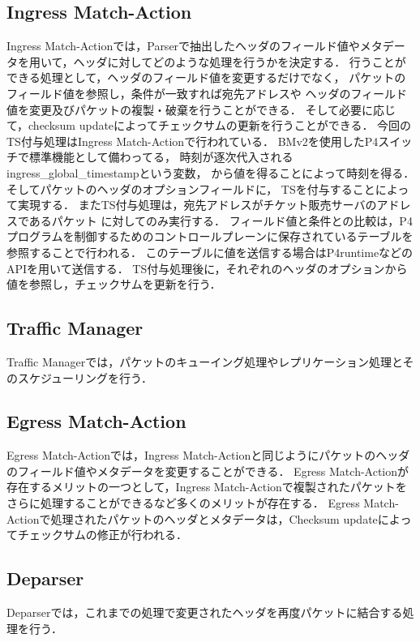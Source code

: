 \documentclass[a4j,11pt]{jreport}
\begin{document}
\subsection{Ingress Match-Action}
Ingress Match-Actionでは，Parserで抽出したヘッダのフィールド値やメタデータを用いて，ヘッダに対してどのような処理を行うかを決定する．
行うことができる処理として，ヘッダのフィールド値を変更するだけでなく，
パケットのフィールド値を参照し，条件が一致すれば宛先アドレスや
ヘッダのフィールド値を変更及びパケットの複製・破棄を行うことができる．
そして必要に応じて，checksum updateによってチェックサムの更新を行うことができる．
今回のTS付与処理はIngress Match-Actionで行われている．
BMv2を使用したP4スイッチで標準機能として備わってる，
時刻が逐次代入されるingress\_global\_timestampという変数，
から値を得ることによって時刻を得る．そしてパケットのヘッダのオプションフィールドに，
TSを付与することによって実現する．
またTS付与処理は，宛先アドレスがチケット販売サーバのアドレスであるパケット
に対してのみ実行する．
フィールド値と条件との比較は，P4プログラムを制御するためのコントロールプレーンに保存されているテーブルを参照することで行われる．
このテーブルに値を送信する場合はP4runtimeなどのAPIを用いて送信する．
TS付与処理後に，それぞれのヘッダのオプションから値を参照し，チェックサムを更新を行う．



\subsection{Traffic Manager}
Traffic Managerでは，パケットのキューイング処理やレプリケーション処理とそのスケジューリングを行う．

\subsection{Egress Match-Action}
Egress Match-Actionでは，Ingress Match-Actionと同じようにパケットのヘッダのフィールド値やメタデータを変更することができる．
Egress Match-Actionが存在するメリットの一つとして，Ingress Match-Actionで複製されたパケットをさらに処理することができるなど多くのメリットが存在する．
Egress Match-Actionで処理されたパケットのヘッダとメタデータは，Checksum updateによってチェックサムの修正が行われる．

\subsection{Deparser}
Deparserでは，これまでの処理で変更されたヘッダを再度パケットに結合する処理を行う．
\end{document}

